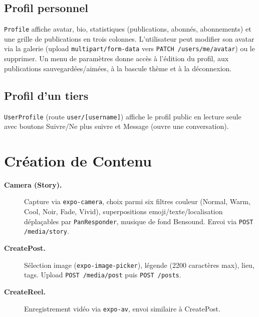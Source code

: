 \subsection{Profil personnel}
\texttt{Profile} affiche avatar, bio, statistiques (publications, abonnés, abonnements) et une grille de publications en trois colonnes. L'utilisateur peut modifier son avatar via la galerie (upload \texttt{multipart/form-data} vers \texttt{PATCH /users/me/avatar}) ou le supprimer. Un menu de paramètres donne accès à l'édition du profil, aux publications sauvegardées/aimées, à la bascule thème et à la déconnexion.

\subsection{Profil d'un tiers}
\texttt{UserProfile} (route \texttt{user/[username]}) affiche le profil public en lecture seule avec boutons Suivre/Ne plus suivre et Message (ouvre une conversation).

\section{Création de Contenu}

\begin{description}
  \item[\textbf{Camera (Story).}] Capture via \texttt{expo-camera}, choix parmi six filtres couleur (Normal, Warm, Cool, Noir, Fade, Vivid), superpositions emoji/texte/localisation déplaçables par \texttt{PanResponder}, musique de fond Bensound. Envoi via \texttt{POST /media/story}.
  \item[\textbf{CreatePost.}] Sélection image (\texttt{expo-image-picker}), légende (2200 caractères max), lieu, tags. Upload \texttt{POST /media/post} puis \texttt{POST /posts}.
  \item[\textbf{CreateReel.}] Enregistrement vidéo via \texttt{expo-av}, envoi similaire à CreatePost.
\end{description}
